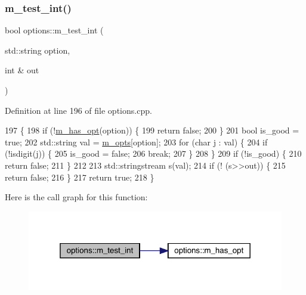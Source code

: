 \subsubsection{\texorpdfstring{m\+\_\+test\+\_\+int()}{m\_test\_int()}}
{\footnotesize\ttfamily bool options\+::m\+\_\+test\+\_\+int (\begin{DoxyParamCaption}\item[{std\+::string}]{option,  }\item[{int \&}]{out }\end{DoxyParamCaption})\hspace{0.3cm}{\ttfamily [private]}}



Definition at line 196 of file options.\+cpp.


\begin{DoxyCode}
197 \{
198   \textcolor{keywordflow}{if} (!\hyperlink{classoptions_a99183ba43c8d7b35dbfa1bea0f43db48}{m\_has\_opt}(option)) \{
199     \textcolor{keywordflow}{return} \textcolor{keyword}{false};
200   \}
201   \textcolor{keywordtype}{bool} is\_good = \textcolor{keyword}{true};
202   std::string val = \hyperlink{classoptions_ac73507ca925d98ee5ff6f04937dff5c3}{m\_opts}[option];
203   \textcolor{keywordflow}{for} (\textcolor{keywordtype}{char} j : val) \{
204     \textcolor{keywordflow}{if} (!isdigit(j)) \{
205       is\_good = \textcolor{keyword}{false};
206       \textcolor{keywordflow}{break};
207     \}
208   \}
209   \textcolor{keywordflow}{if} (!is\_good) \{
210     \textcolor{keywordflow}{return} \textcolor{keyword}{false};
211   \}
212 
213   std::stringstream s(val);
214   \textcolor{keywordflow}{if} (! (s>>out)) \{
215     \textcolor{keywordflow}{return} \textcolor{keyword}{false};
216   \}
217   \textcolor{keywordflow}{return} \textcolor{keyword}{true};
218 \}
\end{DoxyCode}
Here is the call graph for this function\+:\nopagebreak
\begin{figure}[H]
\begin{center}
\leavevmode
\includegraphics[width=319pt]{classoptions_ad9b4461e633b73acc2fde7752ef60d41_cgraph}
\end{center}
\end{figure}
